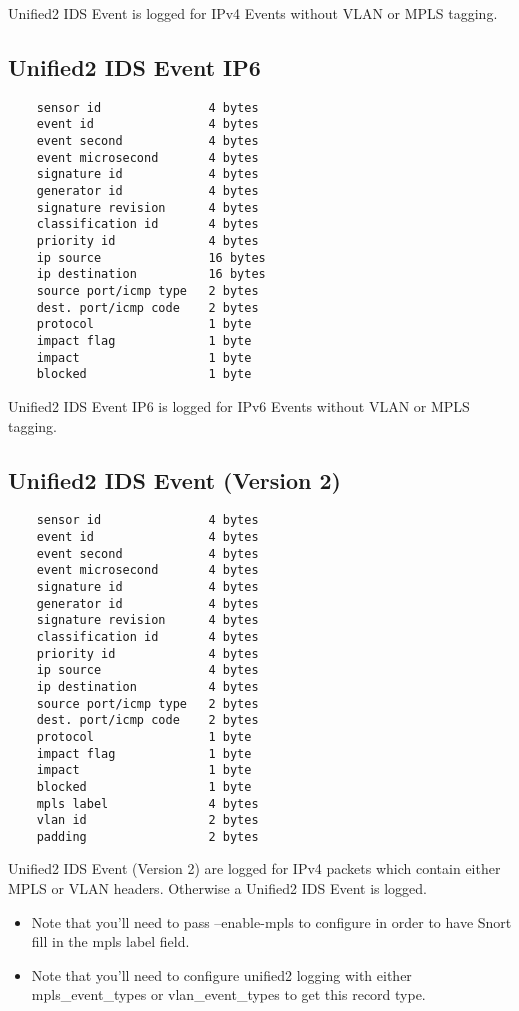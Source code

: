 \documentclass[english]{report}
\newenvironment{note}{
\samepage
    \vspace{10pt}{\textsf{
        {\hspace{7pt}\Huge{$\triangle$\hspace{-12.5pt}{\Large{$^!$}}}}\hspace{5pt}
        {\Large{NOTE}}
    }
    }
   \begin{center}
    \par\vspace{-17pt}

    \begin{lrbox}{\savepar}
    \begin{minipage}[r]{6in}
}
{
    \end{minipage}
    \end{lrbox}
    \fbox{
        \usebox{
            \savepar
	}
    }
    \par\vskip10pt
    \end{center}
}
\newenvironment{note}{
        \begin{rawhtml}
        <p><table border="1"><tr><td><b>
        Note:&nbsp;&nbsp;</b>
        \end{rawhtml}
}{
        \begin{rawhtml}
        </b></td></tr></table></p>
        \end{rawhtml}
}
\begin{document}
  Unified2 IDS Event is logged for IPv4 Events without VLAN or MPLS
  tagging. 

\subsection{Unified2 IDS Event IP6}

\begin{verbatim}
    sensor id               4 bytes
    event id                4 bytes
    event second            4 bytes
    event microsecond       4 bytes
    signature id            4 bytes
    generator id            4 bytes
    signature revision      4 bytes
    classification id       4 bytes
    priority id             4 bytes
    ip source               16 bytes
    ip destination          16 bytes
    source port/icmp type   2 bytes
    dest. port/icmp code    2 bytes
    protocol                1 byte
    impact flag             1 byte
    impact                  1 byte
    blocked                 1 byte
\end{verbatim}

  Unified2 IDS Event IP6 is logged for IPv6 Events without VLAN or 
  MPLS tagging. 

\subsection{Unified2 IDS Event (Version 2)}

\begin{verbatim}
    sensor id               4 bytes
    event id                4 bytes
    event second            4 bytes
    event microsecond       4 bytes
    signature id            4 bytes
    generator id            4 bytes
    signature revision      4 bytes
    classification id       4 bytes
    priority id             4 bytes
    ip source               4 bytes
    ip destination          4 bytes
    source port/icmp type   2 bytes
    dest. port/icmp code    2 bytes
    protocol                1 byte
    impact flag             1 byte
    impact                  1 byte
    blocked                 1 byte
    mpls label              4 bytes
    vlan id                 2 bytes
    padding                 2 bytes
\end{verbatim}

  Unified2 IDS Event (Version 2) are logged for IPv4 packets which
  contain either  MPLS or VLAN headers. Otherwise a Unified2 IDS Event
  is logged.

\begin{note}
\begin{itemize}
\item Note that you'll need to pass --enable-mpls to configure in order to have Snort fill in the mpls label field.

\item Note that you'll need to configure unified2 logging with either mpls\_event\_types or vlan\_event\_types to get this record type.
\end{itemize}
\end{note}
\end{document}
